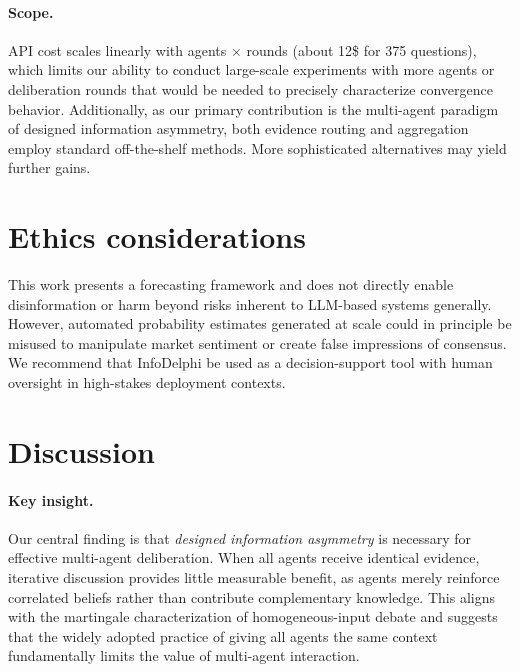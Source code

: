 \documentclass[11pt]{article}
\theoremstyle{plain}
\theoremstyle{definition}
\begin{document}

\paragraph{Scope.}
API cost scales linearly with agents × rounds (about 12\$ for 375 questions), which limits our ability to conduct large-scale experiments with more agents or deliberation rounds that would be needed to precisely characterize convergence behavior.
Additionally, as our primary contribution is the multi-agent paradigm of designed information asymmetry, both evidence routing and aggregation employ standard off-the-shelf methods.
More sophisticated alternatives may yield further gains.

\section*{Ethics considerations}
  This work presents a forecasting framework and does not directly enable disinformation or harm beyond risks inherent to LLM-based systems generally. However, automated probability estimates generated at scale could in principle be misused to manipulate market sentiment or create false impressions of consensus. We recommend that InfoDelphi be used as a decision-support tool with human oversight in high-stakes deployment contexts.


\appendix

\section{Discussion}
\paragraph{Key insight.}
Our central finding is that \textit{designed information asymmetry} is necessary for effective multi-agent deliberation.
When all agents receive identical evidence, iterative discussion provides little measurable benefit, as agents merely reinforce correlated beliefs rather than contribute complementary knowledge.
This aligns with the martingale characterization of homogeneous-input debate and suggests that the widely adopted practice of giving all agents the same context fundamentally limits the value of multi-agent interaction.
\end{document}
